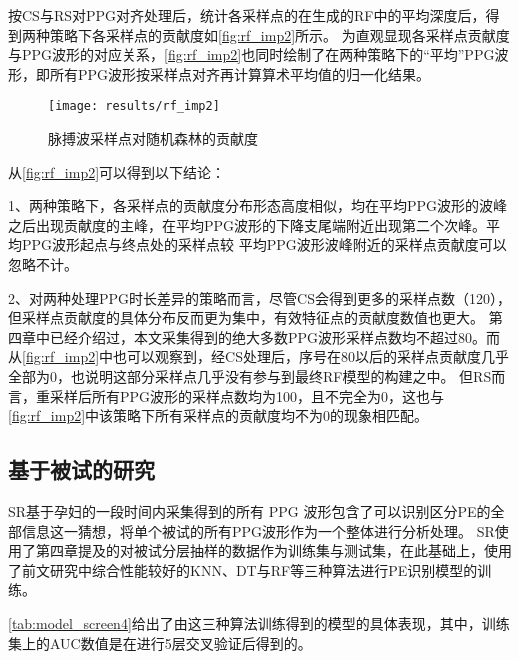 按CS与RS对PPG对齐处理后，统计各采样点的在生成的RF中的平均深度后，得到两种策略下各采样点的贡献度如\autoref{fig:rf_imp2}所示。
为直观显现各采样点贡献度与PPG波形的对应关系，\autoref{fig:rf_imp2}也同时绘制了在两种策略下的“平均”PPG波形，即所有PPG波形按采样点对齐再计算算术平均值的归一化结果。

\begin{figure}[htbp]
      \centering
      \texttt{[image: results/rf\_imp2]}
      \caption{\label{fig:rf_imp2}脉搏波采样点对随机森林的贡献度}
\end{figure}

从\autoref{fig:rf_imp2}可以得到以下结论：

1、两种策略下，各采样点的贡献度分布形态高度相似，均在平均PPG波形的波峰之后出现贡献度的主峰，在平均PPG波形的下降支尾端附近出现第二个次峰。平均PPG波形起点与终点处的采样点较
平均PPG波形波峰附近的采样点贡献度可以忽略不计。

2、对两种处理PPG时长差异的策略而言，尽管CS会得到更多的采样点数（120），但采样点贡献度的具体分布反而更为集中，有效特征点的贡献度数值也更大。
第四章中已经介绍过，本文采集得到的绝大多数PPG波形采样点数均不超过80。而从\autoref{fig:rf_imp2}中也可以观察到，经CS处理后，序号在80以后的采样点贡献度几乎全部为0，也说明这部分采样点几乎没有参与到最终RF模型的构建之中。
但RS而言，重采样后所有PPG波形的采样点数均为100，且不完全为0，这也与\autoref{fig:rf_imp2}中该策略下所有采样点的贡献度均不为0的现象相匹配。

\subsection{基于被试的研究}
SR基于孕妇的一段时间内采集得到的所有 PPG 波形包含了可以识别区分PE的全部信息这一猜想，将单个被试的所有PPG波形作为一个整体进行分析处理。
SR使用了第四章提及的对被试分层抽样的数据作为训练集与测试集，在此基础上，使用了前文研究中综合性能较好的KNN、DT与RF等三种算法进行PE识别模型的训练。

\autoref{tab:model_screen4}给出了由这三种算法训练得到的模型的具体表现，其中，训练集上的AUC数值是在进行5层交叉验证后得到的。

